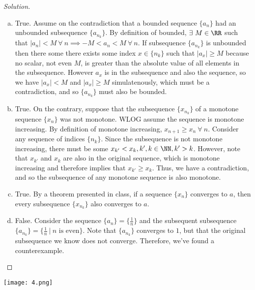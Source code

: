 \documentclass[12pt]{scrartcl}
\begin{document}
\begin{proof}[Solution]

\hfill

\begin{enumerate}[a.]
  \item True. Assume on the contradiction that a bounded sequence $\{a_n\}$ had an unbounded subsequence $\{a_{n_k}\}$. 
  By definition of bounded, $\exists \ M \in \RR$ such that $|a_n| < M \ \forall \ n \implies -M < a_n < M \ \forall \ n$.
  If subsequence $\{a_{n_k}\}$ is unbounded then there some there exists some index $x \in \{n_k\}$ such that 
  $|a_x| \geq M$ because no scalar, not even $M$, is greater than the absolute value of all elements in the subsequence. 
  However $a_x$ is in the subsequence and also the sequence, so we have $|a_x| < M$ and $|a_x| \geq M$ simulatenously, which
  must be a contradiction, and so $\{a_{n_k}\}$ must also be bounded.
  \item True. On the contrary, suppose that the subsequence $\{x_{n_k}\}$ of a monotone sequence $\{x_n\}$ 
  was not monotone. WLOG assume the sequence is monotone increasing. By definition of monotone increasing, 
  $x_{n+1} \geq x_n \ \forall \ n$. Consider any sequence of indices $\{n_k\}$. Since the subsequence is not 
  monotone increasing, there must be some $x_{k'} < x_k, k', k \in \NN, k' > k$. However, note that 
  $x_{k'}$ and $x_k$ are also in the original sequence, which is monotone increasing and therefore 
  implies that $x_{k'} \geq x_k$. Thus, we have a contradiction, and so the subsequence of any monotone sequence 
  is also monotone.
  \item True. By a theorem presented in class, if a sequence $\{x_n\}$ converges to $a$, then 
  every subsequence $\{x_{n_k}\}$ also converges to $a$.
  \item False. Consider the sequence $\{a_n\} = \{\frac{1}{n}\}$ and the subsequent subsequence 
  $\{a_{n_k}\} = \{\frac{1}{n} \ | \ n \text{ is even}\}$. Note that $\{a_{n_k}\}$ converges to $1$, 
  but that the original subsequence we know does not converge. Therefore, we've found a counterexample.
\end{enumerate}
  
\end{proof}

\newpage

\texttt{[image: 4.png]}
\end{document}

